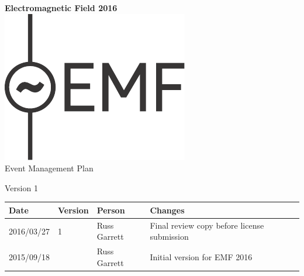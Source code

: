 

\newcommand{\st}{\superscript{st} }
\newcommand{\nd}{\superscript{nd} }
\renewcommand{\th}{\superscript{th} }




\begin{titlepage}
\thispagestyle{empty}
\begin{center}
{\bf \LARGE Electromagnetic Field 2016}\\[36pt]
\includegraphics{emf-logo.pdf}\\[48pt]
{\Large Event Management Plan}

Version 1

\vfill

\begin{tabular}{l | l | l | p{10cm}}
  Date & Version & Person & Changes \\
  \hline
  2016/03/27 & 1 & Russ Garrett & Final review copy before license submission\\
  \hline
  2015/09/18 &  & Russ Garrett & Initial version for EMF 2016 \\
\end{tabular}

\end{center}
\end{titlepage}

\tableofcontents

\newpage



